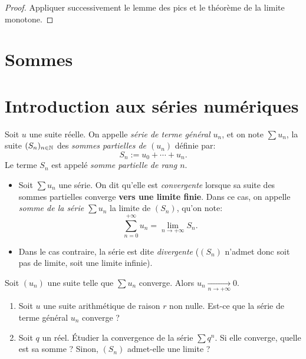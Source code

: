 \documentclass[../main.tex]{subfiles}
\begin{document}
\begin{proof}
	Appliquer successivement le lemme des pics et le théorème de la limite monotone.
\end{proof}


\section{Sommes}

\section{Introduction aux séries numériques}

\begin{mydef}[Série]
	Soit $u$ une suite réelle. On appelle \textit{série de terme général $u_n$}, et on note $\sum u_n$, la suite $(S_n)_{n\in\mathbb N}$ des \textit{sommes partielles de $(u_n)$} définie par:
	\[
	S_n := u_0 + \cdots + u_n.
	\]
	Le terme $S_n$ est appelé \textit{somme partielle de rang $n$}.
\end{mydef}

\begin{mydef}\leavevmode
	\begin{itemize}
		\item Soit $\sum u_n$ une série. On dit qu'elle est \textit{convergente} lorsque sa suite des sommes partielles converge \textbf{vers une limite finie}. Dans ce cas, on appelle \textit{somme de la série $\sum u_n$} la limite de $(S_n)$, qu'on note:
		\[
		\sum_{n=0}^{+\infty} u_n = \lim_{n\to +\infty} S_n.
		\]
		\item Dans le cas contraire, la série est dite \textit{divergente} ($(S_n)$ n'admet donc soit pas de limite, soit une limite infinie).
	\end{itemize}
\end{mydef}

\begin{prop}
	Soit $(u_n)$ une suite telle que $\sum u_n$ converge. Alors $u_n\xrightarrow[n\to+\infty]{}0$.
\end{prop}

\begin{exo}[M]
	\begin{enumerate}
		\item Soit $u$ une suite arithmétique de raison $r$ non nulle. Est-ce que la série de terme général $u_n$ converge ?
		\item Soit $q$ un réel. Étudier la convergence de la série $\sum q^n$. Si elle converge, quelle est sa somme ? Sinon, $(S_n)$ admet-elle une limite ?
	\end{enumerate}
\end{exo}
\end{document}
